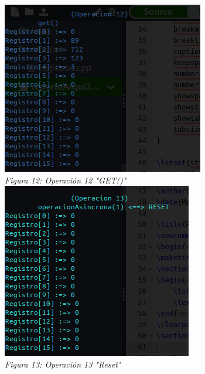 \documentclass[12pt,executivepaper]{article}
\begin{document}
\begin{center}
    \includegraphics[scale=1]{imgs/trece.png}\\
    \textit{Figura 12: Operación 12 "GET()"}\\
    \includegraphics[scale=1]{imgs/catorce.png}\\
    \textit{Figura 13: Operación 13 "Reset"}\\

\end{center}
\end{document}
